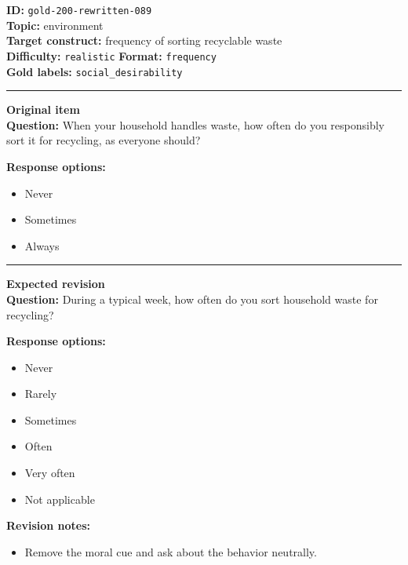 \documentclass[10pt,a4paper]{article}
\newcommand{\sectionline}{\vspace{0.15em}\hrule\vspace{0.35em}}
\begin{document}
\begin{tcolorbox}[colframe=FlawRed,colback=white,colbacktitle=FlawRed!9,coltitle=black,title={Item 089\hfill Flawed item}]
\textbf{ID:} \texttt{gold-200-rewritten-089}\\
\textbf{Topic:} environment\\
\textbf{Target construct:} frequency of sorting recyclable waste\\
\textbf{Difficulty:} \texttt{realistic} \quad \textbf{Format:} \texttt{frequency}\\
\textbf{Gold labels:} \texttt{social\_desirability}\\
\sectionline
\textbf{Original item}\\
\textbf{Question:} When your household handles waste, how often do you responsibly sort it for recycling, as everyone should?
\par\textbf{Response options:}
\begin{itemize}
\item Never
\item Sometimes
\item Always
\end{itemize}
\sectionline
\textbf{Expected revision}\\
\textbf{Question:} During a typical week, how often do you sort household waste for recycling?
\par\textbf{Response options:}
\begin{itemize}
\item Never
\item Rarely
\item Sometimes
\item Often
\item Very often
\item Not applicable
\end{itemize}
\par\textbf{Revision notes:}
\begin{itemize}
\item Remove the moral cue and ask about the behavior neutrally.
\end{itemize}
\end{tcolorbox}
\end{document}
